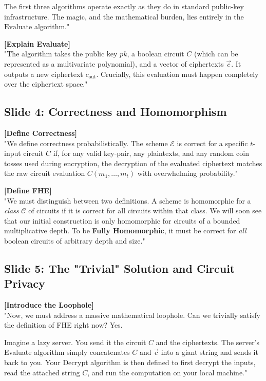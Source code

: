 \documentclass[11pt]{article}
\begin{document}
The first three algorithms operate exactly as they do in standard public-key infrastructure. The magic, and the mathematical burden, lies entirely in the $\text{Evaluate}$ algorithm."

\textbf{[Explain Evaluate]} \\
"The algorithm takes the public key $pk$, a boolean circuit $C$ (which can be represented as a multivariate polynomial), and a vector of ciphertexts $\vec{c}$. It outputs a new ciphertext $c_{\text{out}}$. Crucially, this evaluation must happen completely over the ciphertext space."

\subsection*{Slide 4: Correctness and Homomorphism}
\textbf{[Define Correctness]} \\
"We define correctness probabilistically. The scheme $\mathcal{E}$ is correct for a specific $t$-input circuit $C$ if, for any valid key-pair, any plaintexts, and any random coin tosses used during encryption, the decryption of the evaluated ciphertext matches the raw circuit evaluation $C(m_1, \dots, m_t)$ with overwhelming probability."

\textbf{[Define FHE]} \\
"We must distinguish between two definitions. A scheme is homomorphic for a \textit{class} $\mathcal{C}$ of circuits if it is correct for all circuits within that class. We will soon see that our initial construction is only homomorphic for circuits of a bounded multiplicative depth. To be \textbf{Fully Homomorphic}, it must be correct for \textit{all} boolean circuits of arbitrary depth and size."

\subsection*{Slide 5: The "Trivial" Solution and Circuit Privacy}
\textbf{[Introduce the Loophole]} \\
"Now, we must address a massive mathematical loophole. Can we trivially satisfy the definition of FHE right now? Yes. 

Imagine a lazy server. You send it the circuit $C$ and the ciphertexts. The server's Evaluate algorithm simply concatenates $C$ and $\vec{c}$ into a giant string and sends it back to you. Your Decrypt algorithm is then defined to first decrypt the inputs, read the attached string $C$, and run the computation on your local machine."
\end{document}
